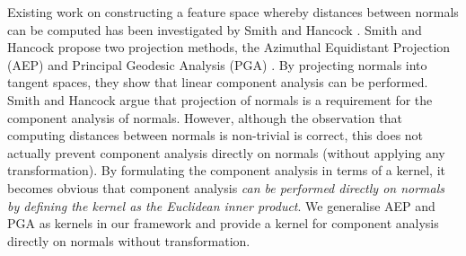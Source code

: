 Existing work on constructing a feature space whereby distances between normals
can be computed has been investigated by Smith and Hancock
\cite{RefWorks:90,RefWorks:86}. Smith and Hancock propose two projection
methods, the Azimuthal Equidistant Projection (AEP) \cite{RefWorks:102} and
Principal Geodesic Analysis (PGA) \cite{RefWorks:100,RefWorks:101}. By
projecting normals into tangent spaces, they show that linear component analysis
can be performed. Smith and Hancock argue that projection of normals is a
requirement for the component analysis of normals. However, although the
observation that computing distances between normals is non-trivial is correct,
this does not actually prevent component analysis directly on normals
(\ie without applying any transformation). By formulating the component analysis in
terms of a kernel, it becomes obvious that component analysis \textit{can be
performed directly on normals by defining the kernel as the Euclidean inner
product}. We generalise AEP and PGA as kernels in our framework and provide a
kernel for component analysis directly on normals without transformation.
{
\newcommand{\aepname}{\operatorname{AEP}}
\newcommand{\ipname}{\operatorname{IP}}
\newcommand{\sphername}{\operatorname{SPHER}}
\newcommand{\pganame}{\operatorname{PGA}}
\newcommand{\lsname}{\operatorname{LS}}

\newcommand{\ip}{\Phi_{\ipname} (\bb{x}_k)}
\newcommand{\invip}{{\Phi_{\ipname}}^{-1} (\bb{v}_k)}
\newcommand{\spher}{\Phi_{\sphername} (\bb{x}_k)}
\newcommand{\invspher}{{\Phi_{\sphername}}^{-1} (\bb{v}_k)}
\newcommand{\aep}{\Phi_{\aepname} (\bb{x}_k)}
\newcommand{\invaep}{{\Phi_{\aepname}}^{-1} (\bb{v}_k)}
\newcommand{\pga}{\Phi_{\pganame} (\bb{x}_k)}
\newcommand{\invpga}{{\Phi_{\pganame}}^{-1} (\bb{v}_k)}
\newcommand{\ls}{\Phi_{\lsname} (\bb{x}_k)}
\newcommand{\invls}{{\Phi_{\lsname}}^{-1} (\bb{v}_k)}


\newcommand{\g}{\bb{g}}
\newcommand{\tildeg}{\bb{\tilde{g}}}
\newcommand{\W}{\bb{W}}
\newcommand{\deltap}{\bb{\Delta{} p}}
\newcommand{\x}{\bb{x}}
\newcommand{\I}{\bb{I}}
\newcommand{\GTwo}{\bb{G_2}}
\newcommand{\GOne}{\bb{G_1}}
\newcommand{\J}{\bb{J}}
\newcommand{\zero}{\bb{0}}
\newcommand{\p}{\bb{p}}


}
\stopcontents[chapters]
